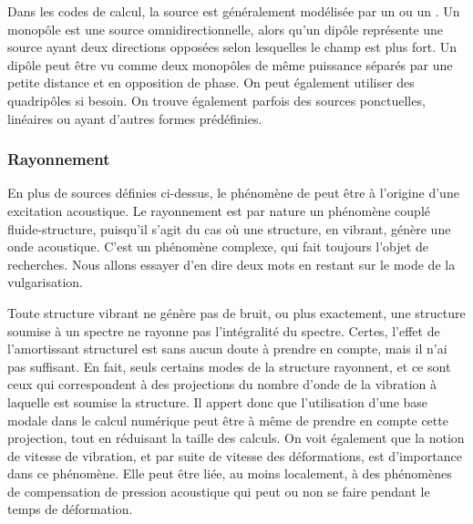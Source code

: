 Dans les codes de calcul, la source est généralement modélisée par un  ou un . Un monopôle est une source omnidirectionnelle, alors qu'un dipôle représente une source ayant deux directions opposées selon lesquelles le champ est plus fort. Un dipôle peut être vu comme deux monopôles de même puissance séparés par une petite distance et en opposition de phase. On peut également utiliser des quadripôles si besoin.
   On trouve également parfois des sources ponctuelles, linéaires ou ayant d'autres formes prédéfinies.
   
\medskip
\subsubsection{Rayonnement}

En plus de sources définies ci-dessus, le phénomène de  peut être à l'origine d'une excitation acoustique. Le rayonnement est par nature un phénomène couplé fluide-structure, puisqu'il s'agit du cas où une structure, en vibrant, génère une onde acoustique. C'est un phénomène complexe, qui fait toujours l'objet de recherches. Nous allons essayer d'en dire deux mots en restant sur le mode de la vulgarisation.

\begin{remarque}
Toute structure vibrant ne génère pas de bruit, ou plus exactement, une structure soumise à un spectre ne rayonne pas l'intégralité du spectre. Certes, l'effet de l'amortissant structurel est sans aucun doute à prendre en compte, mais il n'ai pas suffisant. En fait, seuls certains modes de la structure rayonnent, et ce sont ceux qui correspondent à des projections du nombre d'onde de la vibration à laquelle est soumise la structure. Il appert donc que l'utilisation d'une base modale dans le calcul numérique peut être à même de prendre en compte cette projection, tout en réduisant la taille des calculs. On voit également que la notion de vitesse de vibration, et par suite de vitesse des déformations, est d'importance dans ce phénomène. Elle peut être liée, au moins localement, à des phénomènes de compensation de pression acoustique qui peut ou non se faire pendant le temps de déformation.
\end{remarque}

